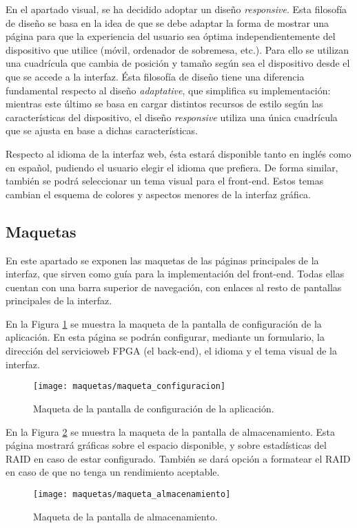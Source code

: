 En el apartado visual, se ha decidido adoptar un diseño \textit{responsive}.
Esta filosofía de diseño se basa en la idea de que se debe adaptar la forma de mostrar una página para que la experiencia del usuario sea óptima independientemente del dispositivo que utilice (móvil, ordenador de sobremesa, etc.).
Para ello se utilizan una cuadrícula que cambia de posición y tamaño según sea el dispositivo desde el que se accede a la interfaz.
Ésta filosofía de diseño tiene una diferencia fundamental respecto al diseño \textit{adaptative}, que simplifica su implementación: mientras este último se basa en cargar distintos recursos de estilo según las características del dispositivo, el diseño \textit{responsive} utiliza una única cuadrícula que se ajusta en base a dichas características.

Respecto al idioma de la interfaz web, ésta estará disponible tanto en inglés como en español, pudiendo el usuario elegir el idioma que prefiera.
De forma similar, también se podrá seleccionar un tema visual para el \gls{front-end}.
Estos temas cambian el esquema de colores y aspectos menores de la interfaz gráfica.


\subsection{Maquetas\label{ssec:dis:maquetas}}

En este apartado se exponen las maquetas de las páginas principales de la interfaz, que sirven como guía para la implementación del \gls{front-end}.
Todas ellas cuentan con una barra superior de navegación, con enlaces al resto de pantallas principales de la interfaz.

En la Figura \ref{fig:maqueta:configuracion} se muestra la maqueta de la pantalla de configuración de la aplicación.
En esta página se podrán configurar, mediante un formulario, la dirección del \gls{servicioweb} \gls{FPGA} (el \gls{back-end}), el idioma y el tema visual de la interfaz.
\begin{figure}[!htp]
  \centering
  \texttt{[image: maquetas/maqueta\_configuracion]}
  \caption{Maqueta de la pantalla de configuración de la aplicación.}
  \label{fig:maqueta:configuracion}
\end{figure}
\clearpage

En la Figura \ref{fig:maqueta:almacenamiento} se muestra la maqueta de la pantalla de almacenamiento.
Esta página mostrará gráficas sobre el espacio disponible, y sobre estadísticas del \gls{RAID} en caso de estar configurado.
También se dará opción a formatear el \gls{RAID} en caso de que no tenga un rendimiento aceptable.
\begin{figure}[!htp]
  \centering
  \texttt{[image: maquetas/maqueta\_almacenamiento]}
  \caption{Maqueta de la pantalla de almacenamiento.}
  \label{fig:maqueta:almacenamiento}
\end{figure}
\clearpage

